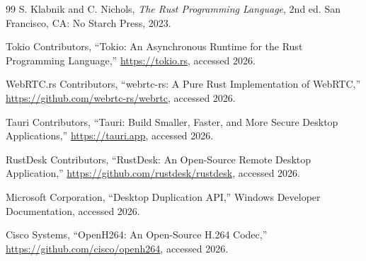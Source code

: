 \begin{thebibliography}{99}
 S. Klabnik and C. Nichols, \emph{The Rust Programming Language},
2nd ed. San Francisco, CA: No Starch Press, 2023.

 Tokio Contributors, ``Tokio: An Asynchronous Runtime for the
Rust Programming Language,'' \url{https://tokio.rs}, accessed 2026.

 WebRTC.rs Contributors, ``webrtc-rs: A Pure Rust
Implementation of WebRTC,'' \url{https://github.com/webrtc-rs/webrtc}, accessed
2026.

 Tauri Contributors, ``Tauri: Build Smaller, Faster, and More
Secure Desktop Applications,'' \url{https://tauri.app}, accessed 2026.

 RustDesk Contributors, ``RustDesk: An Open-Source Remote
Desktop Application,'' \url{https://github.com/rustdesk/rustdesk}, accessed 2026.

 Microsoft Corporation, ``Desktop Duplication API,'' Windows
Developer Documentation, accessed 2026.

 Cisco Systems, ``OpenH264: An Open-Source H.264 Codec,''
\url{https://github.com/cisco/openh264}, accessed 2026.

\end{thebibliography}
